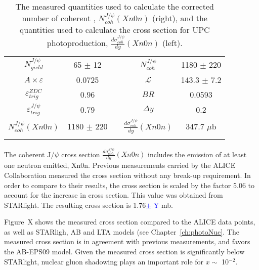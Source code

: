     \begin{table}
      \centering
      \begin{tabular}{|c|c|c|c|c|} \hhline{--~--} 
        $N^{J/\psi}_{yield}$ & 65 $\pm$ 12 & & $N^{J/\psi}_{coh}$  & 1180 $\pm$ 220 \\ \hhline{--~--}  
        $A\times \varepsilon$ & 0.0725  & & $\mathcal{L}$ & 143.3 $\pm$ 7.2 \\ \hhline{--~--}
        $\varepsilon^{ZDC}_{trig}$ & 0.96 & & $BR$ & 0.0593  \\ \hhline{--~--}
        $\varepsilon^{J/\psi}_{trig}$ & 0.79 & & $\Delta y$ & 0.2 \\ \hhline{--~--} \hhline{--~--}
        $N^{J/\psi{}}_{coh} (Xn0n)$ & 1180 $\pm$ 220 & & $\frac{d\sigma^{J/\psi}_{coh}}{dy} (Xn0n)$ & 347.7 $\mu$b \\  \hhline{--~--}
      \end{tabular}
      \caption{\label{tab:nJpCoh}The measured quantities used to calculate the 
        corrected number of coherent \JPsi{}, $N^{J/\psi}_{coh} (Xn0n)$ (right),
        and the quantities used to calculate the cross section for UPC \JPsi{} 
        photoproduction, $\frac{d\sigma^{J/\psi}_{coh}}{dy} (Xn0n)$ (left).}
    \end{table}  
    
    The coherent J/$\psi$ cross section 
      $\frac{d\sigma^{J/\psi}_{coh}}{dy} (Xn0n)$ includes the emission of at 
      least one neutron emitted, Xn0n. 
    Previous measurements carried by the ALICE Collaboration measured the cross
      section without any break-up requirement. 
    In order to compare to their results, the cross section is scaled by the 
      factor 5.06 to account for the increase in cross section. 
    This value was obtained from STARlight. 
    The resulting cross section is 1.76\textcolor{blue}{$\pm$ Y} mb.
    
    Figure~X shows the measured cross section compared to the ALICE data points,
      as well as STARligh, AB and LTA models (see Chapter~\ref{ch:photoNuc}. 
    The measured cross section is in agreement with previous measurements, and 
      favors the AB-EPS09 model. 
    Given the measured cross section is significantly below STARlight, nuclear 
      gluon shadowing plays an important role for $x\sim$ 10$^{-2}$. 

